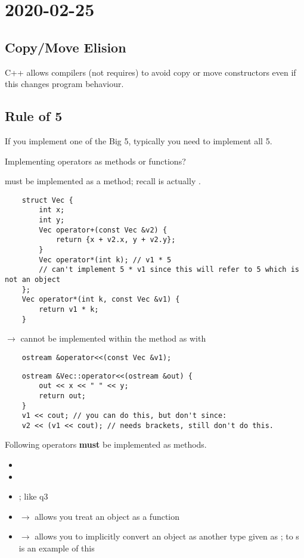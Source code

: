 \section{2020-02-25}
\subsection{Copy/Move Elision}
C++ allows compilers (not requires) to avoid copy or move constructors
even if this changes program behaviour.

\subsection{Rule of 5}
If you implement one of the Big 5, typically you need to implement
all 5.

Implementing operators as methods or functions?

 must be implemented as a method; recall 
is actually .

\begin{lstlisting}
    struct Vec {
        int x;
        int y;
        Vec operator+(const Vec &v2) {
            return {x + v2.x, y + v2.y};
        }
        Vec operator*(int k); // v1 * 5
        // can't implement 5 * v1 since this will refer to 5 which is not an object
    };
    Vec operator*(int k, const Vec &v1) {
        return v1 * k;
    }
\end{lstlisting}
 $ \rightarrow $ cannot be implemented within the method as with
\begin{lstlisting}
    ostream &operator<<(const Vec &v1);
\end{lstlisting}
\begin{lstlisting}
    ostream &Vec::operator<<(ostream &out) {
        out << x << " " << y;
        return out;
    }
    v1 << cout; // you can do this, but don't since:
    v2 << (v1 << cout); // needs brackets, still don't do this.
\end{lstlisting}

Following operators \textbf{must} be implemented as methods.
\begin{itemize}
    \item {}
    \item {}
    \item {}; like q3
    \item {} $ \rightarrow $ allows you treat an object as a function
    \item {} $ \rightarrow $ allows you to implicitly convert
    an object as another type given as ;  to s
    is an example of this
\end{itemize}

